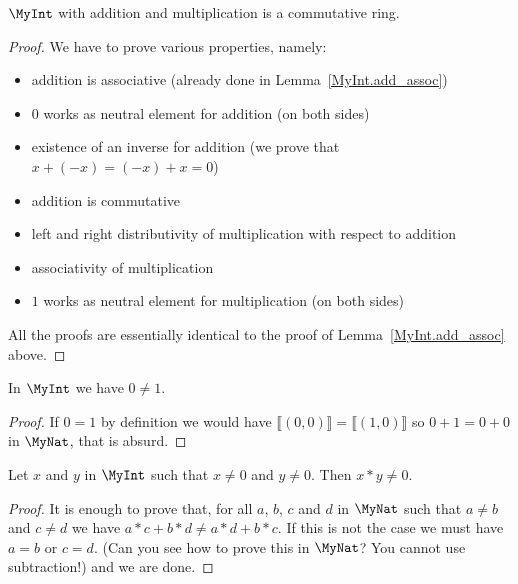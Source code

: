 \begin{proposition}
    \label{MyInt.commRing}
    \leanok
    $\MyInt$ with addition and multiplication is a commutative ring.
\end{proposition}
\begin{proof}
    \leanok
    We have to prove various properties, namely:
    \begin{itemize}
        \item addition is associative (already done in Lemma~\ref{MyInt.add_assoc})
        \item $0$ works as neutral element for addition (on both sides)
        \item existence of an inverse for addition (we prove that $x + (-x) = (-x) + x = 0$)
        \item addition is commutative
        \item left and right distributivity of multiplication with respect to addition
        \item associativity of multiplication
        \item $1$ works as neutral element for multiplication (on both sides)
    \end{itemize}
    All the proofs are essentially identical to the proof of Lemma~\ref{MyInt.add_assoc} above.
\end{proof}

\begin{lemma}
    \label{MyInt.zero_ne_one}
    \leanok
In $\MyInt$ we have $0 \neq 1$.
\end{lemma}
\begin{proof}
    \leanok
    If $0 = 1$ by definition we would have $⟦ (0,0) ⟧ = ⟦ (1,0) ⟧$
    so $0+1=0+0$ in $\MyNat$, that is absurd.
\end{proof}

\begin{lemma}
    \label{MyInt.mul_ne_zero}
    \leanok
Let $x$ and $y$ in $\MyInt$ such that $x \neq 0$ and $y \neq 0$. Then $x*y \neq 0$.
\end{lemma}
\begin{proof}
    \leanok
    It is enough to prove that, for all $a$, $b$, $c$ and $d$ in $\MyNat$ such that $a \neq b$ and $c \neq d$ we have $a*c+b*d\neq a*d+b*c$. If this is not the case we must have $a = b$ or $c = d$. (Can you see how to prove this in $\MyNat$? You cannot use subtraction!) and we are done.
\end{proof}

